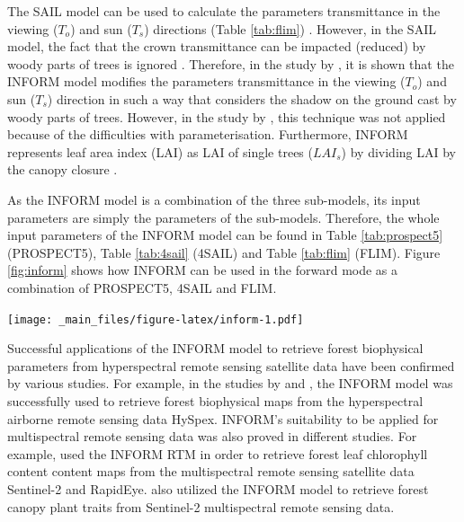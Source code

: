 \documentclass[a4paper, twoside]{templates/ociamthesis}
\let\origfigure\figure
\let\endorigfigure\endfigure
\renewenvironment{figure}[1][2] {
    \expandafter\origfigure\expandafter[H]
} {
    \endorigfigure
}
\begin{document}
The SAIL model can be used to calculate the parameters transmittance in the viewing (\(T_{o}\)) and sun (\(T_{s}\)) directions (Table \ref{tab:flim}) \citep{verhoef1984light}. However, in the SAIL model, the fact that the crown transmittance can be impacted (reduced) by woody parts of trees is ignored \citep{atzberger2000development}. Therefore, in the study by \citet{atzberger2000development}, it is shown that the INFORM model modifies the parameters transmittance in the viewing (\(T_{o}\)) and sun (\(T_{s}\)) direction in such a way that considers the shadow on the ground cast by woody parts of trees. However, in the study by \citet{schlerf2006inversion}, this technique was not applied because of the difficulties with parameterisation. Furthermore, INFORM represents leaf area index (LAI) as LAI of single trees (\(LAI_{s}\)) by dividing LAI by the canopy closure \citep{ali2016retrieval, ali2020machine}.

As the INFORM model is a combination of the three sub-models, its input parameters are simply the parameters of the sub-models. Therefore, the whole input parameters of the INFORM model can be found in Table \ref{tab:prospect5} (PROSPECT5), Table \ref{tab:4sail} (4SAIL) and Table \ref{tab:flim} (FLIM). Figure \ref{fig:inform} shows how INFORM can be used in the forward mode as a combination of PROSPECT5, 4SAIL and FLIM.

\begin{figure}
\centering
\texttt{[image: \_main\_files/figure-latex/inform-1.pdf]}
\caption{\label{fig:inform}Visualization of the INFORM model as a combination of PROSPECT5, 4SAIL and FLIM in the forward mode}
\end{figure}

Successful applications of the INFORM model to retrieve forest biophysical parameters from hyperspectral remote sensing satellite data have been confirmed by various studies. For example, in the studies by \citet{ali2016retrieval} and \citet{wang2017canopy}, the INFORM model was successfully used to retrieve forest biophysical maps from the hyperspectral airborne remote sensing data HySpex. INFORM's suitability to be applied for multispectral remote sensing data was also proved in different studies. For example, \citet{darvishzadeh2019mapping} used the INFORM RTM in order to retrieve forest leaf chlorophyll content content maps from the multispectral remote sensing satellite data Sentinel-2 and RapidEye. \citet{ali2020machine} also utilized the INFORM model to retrieve forest canopy plant traits from Sentinel-2 multispectral remote sensing data.
\end{document}
